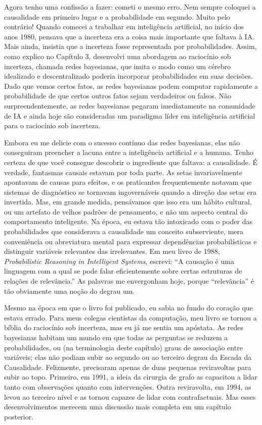 \documentclass[11pt,a5paper,twoside]{book}
\begin{document}
Agora tenho uma confissão a fazer: cometi o mesmo erro. Nem sempre coloquei a causalidade em primeiro lugar e a probabilidade em segundo. Muito pelo contrário! Quando comecei a trabalhar em inteligência artificial, no início dos anos 1980, pensava que a incerteza era a coisa mais importante que faltava à IA. Mais ainda, insistia que a incerteza fosse representada por probabilidades. Assim, como explico no Capítulo 3, desenvolvi uma abordagem ao raciocínio sob incerteza, chamada redes bayesianas, que imita o modo como um cérebro idealizado e descentralizado poderia incorporar probabilidades em suas decisões. Dado que vemos certos fatos, as redes bayesianas podem computar rapidamente a probabilidade de que certos outros fatos sejam verdadeiros ou falsos. Não surpreendentemente, as redes bayesianas pegaram imediatamente na comunidade de IA e ainda hoje são consideradas um paradigma líder em inteligência artificial para o raciocínio sob incerteza.

Embora eu me delicie com o sucesso contínuo das redes bayesianas, elas não conseguiram preencher a lacuna entre a inteligência artificial e a humana. Tenho certeza de que você consegue descobrir o ingrediente que faltava: a causalidade. É verdade, fantasmas causais estavam por toda parte. As setas invariavelmente apontavam de causas para efeitos, e os praticantes frequentemente notavam que sistemas de diagnóstico se tornavam ingovernáveis quando a direção das setas era invertida. Mas, em grande medida, pensávamos que isso era um hábito cultural, ou um artefato de velhos padrões de pensamento, e não um aspecto central do comportamento inteligente. Na época, eu estava tão intoxicado com o poder das probabilidades que considerava a causalidade um conceito subserviente, mera conveniência ou abreviatura mental para expressar dependências probabilísticas e distinguir variáveis relevantes das irrelevantes. Em meu livro de 1988, \textit{Probabilistic Reasoning in Intelligent Systems}, escrevi: “A causação é uma linguagem com a qual se pode falar eficientemente sobre certas estruturas de relações de relevância.” As palavras me envergonham hoje, porque “relevância” é tão obviamente uma noção do degrau um.

Mesmo na época em que o livro foi publicado, eu sabia no fundo do coração que estava errado. Para meus colegas cientistas da computação, meu livro se tornou a bíblia do raciocínio sob incerteza, mas eu já me sentia um apóstata. As redes bayesianas habitam um mundo em que todas as perguntas se reduzem a probabilidades, ou (na terminologia deste capítulo) graus de associação entre variáveis; elas não podiam subir ao segundo ou ao terceiro degrau da Escada da Causalidade. Felizmente, precisaram apenas de duas pequenas reviravoltas para subir ao topo. Primeiro, em 1991, a ideia da cirurgia de grafo as capacitou a lidar tanto com observações quanto com intervenções. Outra reviravolta, em 1994, as levou ao terceiro nível e as tornou capazes de lidar com contrafactuais. Mas esses desenvolvimentos merecem uma discussão mais completa em um capítulo posterior.
\end{document}
